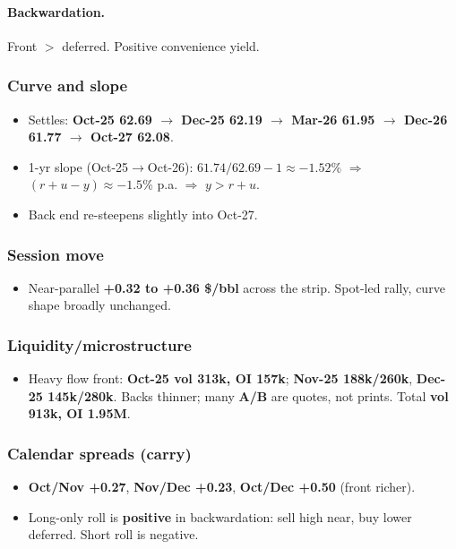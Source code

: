 \documentclass[10pt,a4paper]{article} %
\begin{document}
\paragraph{Backwardation.} Front $>$ deferred. Positive convenience yield.

\subsubsection*{Curve and slope}
\begin{itemize}
  \item Settles: \textbf{Oct-25 62.69 $\rightarrow$ Dec-25 62.19 $\rightarrow$ Mar-26 61.95 $\rightarrow$ Dec-26 61.77 $\rightarrow$ Oct-27 62.08}.
  \item 1-yr slope (Oct-25$\rightarrow$Oct-26): $61.74/62.69-1\approx -1.52\%$ $\Rightarrow$ $(r+u-y)\approx -1.5\%$ p.a. $\Rightarrow$ $y>r+u$.
  \item Back end re-steepens slightly into Oct-27.
\end{itemize}

\subsubsection*{Session move}
\begin{itemize}
  \item Near-parallel \textbf{+0.32 to +0.36 \$/bbl} across the strip. Spot-led rally, curve shape broadly unchanged.
\end{itemize}

\subsubsection*{Liquidity/microstructure}
\begin{itemize}
  \item Heavy flow front: \textbf{Oct-25 vol 313k, OI 157k}; \textbf{Nov-25 188k/260k}, \textbf{Dec-25 145k/280k}. Backs thinner; many \textbf{A/B} are quotes, not prints. Total \textbf{vol 913k, OI 1.95M}.
\end{itemize}

\subsubsection*{Calendar spreads (carry)}
\begin{itemize}
  \item \textbf{Oct/Nov +0.27}, \textbf{Nov/Dec +0.23}, \textbf{Oct/Dec +0.50} (front richer).
  \item Long-only roll is \textbf{positive} in backwardation: sell high near, buy lower deferred. Short roll is negative.
\end{itemize}
\end{document}
